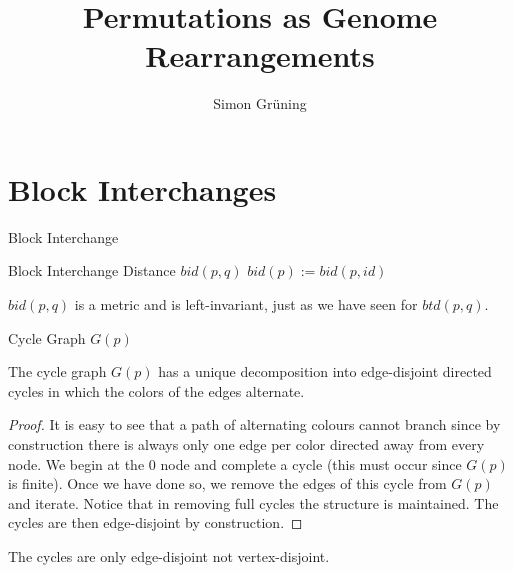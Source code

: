 


\title{Permutations as Genome Rearrangements}
\author{Simon Gr\"uning}
\address[Simon Gr\"uning]{University of Zurich, R\"{a}mistrasse 71, 8006 Zurich}

\maketitle

\clearpage

\section{Block Interchanges}

\begin{definition}
Block Interchange
\end{definition}

\begin{definition}
Block Interchange Distance
$bid(p,q)$
$bid(p) := bid(p,id)$
\end{definition}

\begin{remark}
$bid(p,q)$ is a metric and is left-invariant, just as we have seen for $btd(p,q)$.
\end{remark}

\begin{definition}
Cycle Graph $G(p)$
\end{definition}

\begin{lemma}
The cycle graph $G(p)$ has a unique decomposition into edge-disjoint directed cycles in which the colors of the edges alternate.
\end{lemma}

\begin{proof}
It is easy to see that a path of alternating colours cannot branch since by construction there is always only one edge per color directed away from every node. We begin at the $0$ node and complete a cycle (this must occur since $G(p)$ is finite). Once we have done so, we remove the edges of this cycle from $G(p)$ and iterate. Notice that in removing full cycles the structure is maintained. The cycles are then edge-disjoint by construction.
\end{proof}

\begin{remark}
The cycles are only edge-disjoint not vertex-disjoint.
\end{remark}

